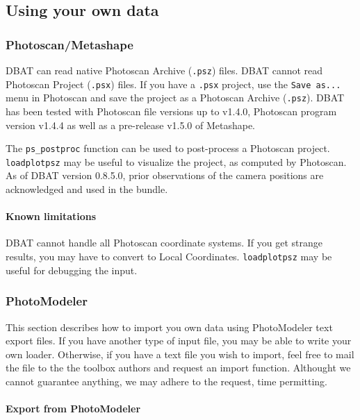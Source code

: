 \documentclass{article}
\begin{document}
\newpage
\subsection{Using your own data}

\subsubsection{Photoscan/Metashape}

DBAT can read native Photoscan Archive (\verb+.psz+) files. DBAT
cannot read Photoscan Project (\verb+.psx+) files. If you have a
\verb+.psx+ project, use the \verb+Save as...+ menu in Photoscan and
save the project as a Photoscan Archive (\verb+.psz+). DBAT has been
tested with Photoscan file versions up to v1.4.0, Photoscan program
version v1.4.4 as well as a pre-release v1.5.0 of Metashape.

The \verb+ps_postproc+ function can be used to post-process a
Photoscan project. \verb+loadplotpsz+ may be useful to visualize the
project, as computed by Photoscan. As of DBAT version 0.8.5.0, prior
observations of the camera positions are acknowledged and used in the
bundle.

\paragraph{Known limitations}

DBAT cannot handle all Photoscan coordinate systems. If you get
strange results, you may have to convert to Local Coordinates. \verb+loadplotpsz+ may be useful for debugging the input.

\subsubsection{PhotoModeler}

This section describes how to import you own data using PhotoModeler
text export files. If you have another type of input file, you may be
able to write your own loader. Otherwise, if you have a text file you
wish to import, feel free to mail the file to the the toolbox authors
and request an import function. Althought we cannot guarantee
anything, we may adhere to the request, time permitting.

\paragraph{Export from PhotoModeler}
\end{document}
